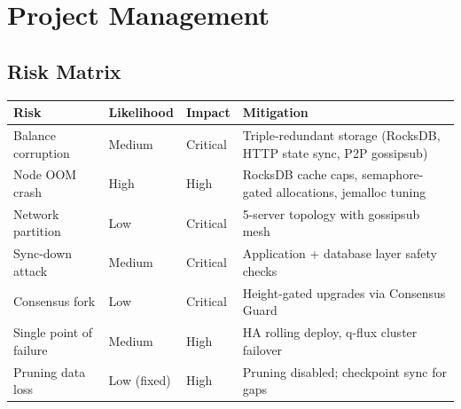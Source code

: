 \documentclass[12pt,a4paper]{article}
\begin{document}
\begin{center}
\end{center}

\section{Project Management}

\subsection{Risk Matrix}

\begin{center}
\begin{tabular}{@{}p{3cm}llp{4.5cm}@{}}
\toprule
\textbf{Risk} & \textbf{Likelihood} & \textbf{Impact} & \textbf{Mitigation} \\
\midrule
Balance corruption & Medium & Critical & Triple-redundant storage (RocksDB, HTTP state sync, P2P gossipsub) \\
Node OOM crash & High & High & RocksDB cache caps, semaphore-gated allocations, jemalloc tuning \\
Network partition & Low & Critical & 5-server topology with gossipsub mesh \\
Sync-down attack & Medium & Critical & Application + database layer safety checks \\
Consensus fork & Low & Critical & Height-gated upgrades via Consensus Guard \\
Single point of failure & Medium & High & HA rolling deploy, q-flux cluster failover \\
Pruning data loss & Low (fixed) & High & Pruning disabled; checkpoint sync for gaps \\
\bottomrule
\end{tabular}
\end{center}
\end{document}
